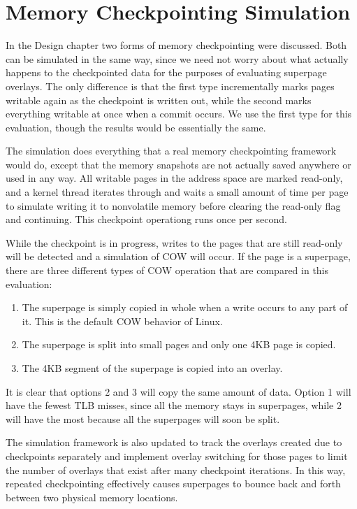 \section{Memory Checkpointing Simulation}

In the Design chapter two forms of memory checkpointing were discussed. Both can be simulated in the same way, since we need not worry about what actually happens to the checkpointed data for the purposes of evaluating superpage overlays. The only difference is that the first type incrementally marks pages writable again as the checkpoint is written out, while the second marks everything writable at once when a commit occurs. We use the first type for this evaluation, though the results would be essentially the same.

The simulation does everything that a real memory checkpointing framework would do, except that the memory snapshots are not actually saved anywhere or used in any way. All writable pages in the address space are marked read-only, and a kernel thread iterates through and waits a small amount of time per page to simulate writing it to nonvolatile memory before clearing the read-only flag and continuing. This checkpoint operationg runs once per second.

While the checkpoint is in progress, writes to the pages that are still read-only will be detected and a simulation of COW will occur. If the page is a superpage, there are three different types of COW operation that are compared in this evaluation:

\begin{enumerate}
  \item The superpage is simply copied in whole when a write occurs to any part of it. This is the default COW behavior of Linux.
  \item The superpage is split into small pages and only one 4KB page is copied.
  \item The 4KB segment of the superpage is copied into an overlay.
\end{enumerate}

It is clear that options 2 and 3 will copy the same amount of data. Option 1 will have the fewest TLB misses, since all the memory stays in superpages, while 2 will have the most because all the superpages will soon be split.

The simulation framework is also updated to track the overlays created due to checkpoints separately and implement overlay switching for those pages to limit the number of overlays that exist after many checkpoint iterations. In this way, repeated checkpointing effectively causes superpages to bounce back and forth between two physical memory locations.

